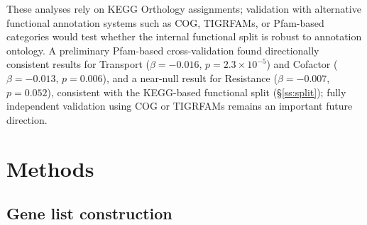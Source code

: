 \documentclass[times]{zHenriquesLab-StyleBioRxiv}
\begin{document}
These analyses rely on KEGG Orthology assignments; validation with
alternative functional annotation systems such as COG, TIGRFAMs, or Pfam-based
categories would test whether the internal functional split is robust to
annotation ontology. A preliminary Pfam-based cross-validation found
directionally consistent results for Transport ($\beta = -0.016$,
$p = 2.3 \times 10^{-5}$) and Cofactor ($\beta = -0.013$, $p = 0.006$), and a
near-null result for Resistance ($\beta = -0.007$, $p = 0.052$), consistent with
the KEGG-based functional split (\S\ref{ss:split}); fully independent validation using
COG or TIGRFAMs remains an important future direction.




\section*{Methods}
\setcounter{subsection}{0}

\subsection{Gene list construction}
\end{document}
